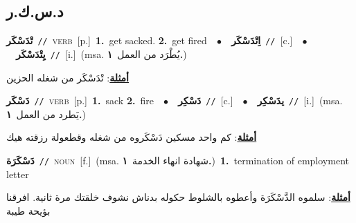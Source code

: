 \documentclass[10pt,a4paper,twoside]{article} %
\begin{document}
\begin{multicols}{2}
\vspace{-3mm}
\subsection*{\color{blue}\foreignlanguage{arabic}{د.س.ك.ر}\color{blue}{}} 

{\setlength\topsep{0pt}\textbf{\foreignlanguage{arabic}{تْدَسْكَر}}\ {\color{gray}\texttt{//}\color{black}}\ \textsc{verb}\ [p.]\ \textbf{1.}~get sacked.  \textbf{2.}~get fired\ \ $\bullet$\ \ \setlength\topsep{0pt}\textbf{\foreignlanguage{arabic}{اِتْدَسْكَر}}\ {\color{gray}\texttt{//}\color{black}}\ [c.]\ \ $\bullet$\ \ \setlength\topsep{0pt}\textbf{\foreignlanguage{arabic}{يِتْدَسْكَر}}\ {\color{gray}\texttt{//}\color{black}}\ [i.]\ \color{gray}(msa. \foreignlanguage{arabic}{يُطْرَد من العمل}~\foreignlanguage{arabic}{\textbf{١.}})\color{black}\  \begin{flushright}\color{gray}\foreignlanguage{arabic}{\textbf{\underline{\foreignlanguage{arabic}{أمثلة}}}: تْدَسْكَر من شغله الحزين}\end{flushright}\color{black}} \vspace{2mm}

{\setlength\topsep{0pt}\textbf{\foreignlanguage{arabic}{دَسْكَر}}\ {\color{gray}\texttt{//}\color{black}}\ \textsc{verb}\ [p.]\ \textbf{1.}~sack  \textbf{2.}~fire\ \ $\bullet$\ \ \setlength\topsep{0pt}\textbf{\foreignlanguage{arabic}{دَسْكِر}}\ {\color{gray}\texttt{//}\color{black}}\ [c.]\ \ $\bullet$\ \ \setlength\topsep{0pt}\textbf{\foreignlanguage{arabic}{يدَسْكِر}}\ {\color{gray}\texttt{//}\color{black}}\ [i.]\ \color{gray}(msa. \foreignlanguage{arabic}{يَطرد من العمل}~\foreignlanguage{arabic}{\textbf{١.}})\color{black}\  \begin{flushright}\color{gray}\foreignlanguage{arabic}{\textbf{\underline{\foreignlanguage{arabic}{أمثلة}}}: كم واحد مسكين دَسْكَروه من شغله وقطعولة رزقته هيك}\end{flushright}\color{black}} \vspace{2mm}

{\setlength\topsep{0pt}\textbf{\foreignlanguage{arabic}{دَسْكَرَة}}\ {\color{gray}\texttt{//}\color{black}}\ \textsc{noun}\ [f.]\ \color{gray}(msa. \foreignlanguage{arabic}{شهادة انهاء الخدمة}~\foreignlanguage{arabic}{\textbf{١.}})\color{black}\ \textbf{1.}~termination of employment letter\  \begin{flushright}\color{gray}\foreignlanguage{arabic}{\textbf{\underline{\foreignlanguage{arabic}{أمثلة}}}: سلموه الدَّسْكَرَة وأعطوه بالشلوط حكوله بدناش نشوف خلقتك مرة ثانية. افرقنا بؤيحة طيبة}\end{flushright}\color{black}} \vspace{2mm}


\end{multicols}
\end{document}
